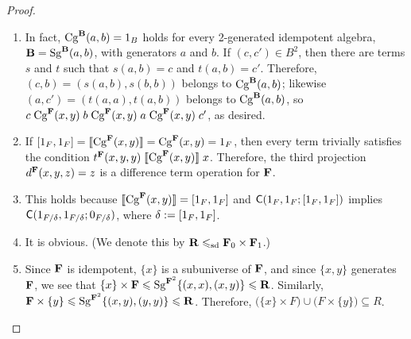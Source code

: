 \begin{proof}\
  \begin{enumerate}
  \item  In fact, $\operatorname{Cg}^{\mathbf{B}}(a,b)=1_B$ holds for every
    2-generated idempotent algebra, $\mathbf{B} = \operatorname{Sg}^{\mathbf{B}}(a,b)$, with generators
    $a$ and $b$.  If $(c,c') \in B^2$, then there are terms $s$ and $t$
    such that $s(a,b) = c$ and $t(a,b) = c'$.  Therefore, 
    $(c,b) = (s(a,b), s(b,b))$ belongs to $\operatorname{Cg}^{\mathbf{B}}(a,b)$; likewise
    $(a,c') = (t(a,a), t(a,b))$ belongs to $\operatorname{Cg}^{\mathbf{B}}(a,b)$, so
    $c \mathrel{\operatorname{Cg}^{\mathbf{F}}(x,y)} b\mathrel{\operatorname{Cg}^{\mathbf{F}}(x,y)} a \mathrel{\operatorname{Cg}^{\mathbf{F}}(x,y)} c'$,
    as desired.
    
    
  \item If $[1_F,1_F] = \llbracket \operatorname{Cg}^{\mathbf{F}}(x,y) \rrbracket = \operatorname{Cg}^{\mathbf{F}}(x,y) = 1_F$, then every term
  trivially satisfies the condition
  $t^{\mathbf{F}}(x,y,y) \mathrel{\llbracket \operatorname{Cg}^{\mathbf{F}}(x,y) \rrbracket} x$.  Therefore, the third projection
  $d^{\mathbf{F}}(x,y,z) = z$ is a difference term operation for $\mathbf{F}$.

\item  This holds because %
  $\llbracket \operatorname{Cg}^{\mathbf{F}}(x,y) \rrbracket = [1_F, 1_F]$ and $\mathsf{C}(1_F, 1_F; [1_F, 1_F])$
  implies $\mathsf{C}(1_{F/\delta}, 1_{F/\delta}; 0_{F/\delta})$, where
  $\delta := [1_F, 1_F]$.

\item It is obvious. 
(We denote this by $\mathbf{R} \leqslant_{\mathrm{sd}} \mathbf{F}_0 \times \mathbf{F}_1$.)


\item
  Since $\mathbf{F}$ is idempotent, $\{x\}$ is a subuniverse of $\mathbf{F}$, and since
  $\{x, y\}$ generates $\mathbf{F}$, we see that
  $\{x\} \times \mathbf{F} \leqslant \operatorname{Sg}^{\mathbf{F}^2}\{(x,x), (x,y)\}\leqslant \mathbf{R}$.
  Similarly, $\mathbf{F}\times \{y\} \leqslant \operatorname{Sg}^{\mathbf{F}^2}\{(x,y), (y,y)\}\leqslant \mathbf{R}$.
  Therefore,
  $\bigl(\{x\} \times F\bigr) \cup \bigl(F \times \{y\}\bigr) \subseteq R$.
  \end{enumerate}

\end{proof}


